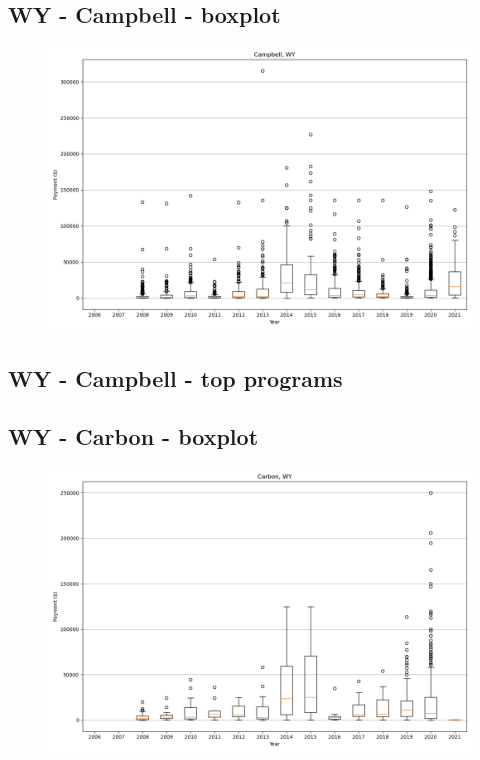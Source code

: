 \subsection*{WY - Campbell - boxplot}
\begin{figure}[h]
\centering
\includegraphics[width=7in]{../output/boxplots/counties/Campbell-WY_boxplot.png}
\end{figure}


\subsection*{WY - Campbell - top programs}

\newpage
\subsection*{WY - Carbon - boxplot}
\begin{figure}[h]
\centering
\includegraphics[width=7in]{../output/boxplots/counties/Carbon-WY_boxplot.png}
\end{figure}


